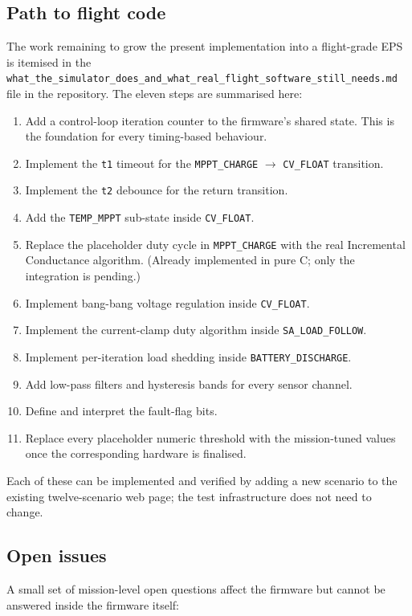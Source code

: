 \subsection{Path to flight code}

The work remaining to grow the present implementation into a
flight-grade EPS is itemised in the
\texttt{what\_the\_simulator\_does\_and\_what\_real\_flight\_software\_still\_needs.md}
file in the repository. The eleven steps are summarised here:

\begin{enumerate}
\item Add a control-loop iteration counter to the firmware's
shared state. This is the foundation for every timing-based
behaviour.
\item Implement the \texttt{t1} timeout for the
\texttt{MPPT\_CHARGE} $\rightarrow$ \texttt{CV\_FLOAT}
transition.
\item Implement the \texttt{t2} debounce for the return
transition.
\item Add the \texttt{TEMP\_MPPT} sub-state inside
\texttt{CV\_FLOAT}.
\item Replace the placeholder duty cycle in
\texttt{MPPT\_CHARGE} with the real Incremental Conductance
algorithm. (Already implemented in pure C; only the
integration is pending.)
\item Implement bang-bang voltage regulation inside
\texttt{CV\_FLOAT}.
\item Implement the current-clamp duty algorithm inside
\texttt{SA\_LOAD\_FOLLOW}.
\item Implement per-iteration load shedding inside
\texttt{BATTERY\_DISCHARGE}.
\item Add low-pass filters and hysteresis bands for every
sensor channel.
\item Define and interpret the fault-flag bits.
\item Replace every placeholder numeric threshold with the
mission-tuned values once the corresponding hardware is
finalised.
\end{enumerate}

Each of these can be implemented and verified by adding a new
scenario to the existing twelve-scenario web page; the test
infrastructure does not need to change.

\subsection{Open issues}

A small set of mission-level open questions affect the
firmware but cannot be answered inside the firmware itself:

